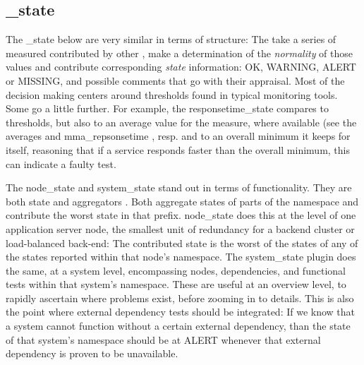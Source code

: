 \subsection{\_state \witches{}}

The \_state \witches{} below are very similar in terms of structure:
The take a series of measured contributed by other \witches{}, make a
determination of the \emph{normality} of those values and contribute
corresponding \emph{state} information: OK, WARNING, ALERT or MISSING,
and possible comments that go with their appraisal. Most of the decision
making centers around thresholds found in typical monitoring tools. Some
go a little further.  For example, the responsetime\_state compares to
thresholds, but also to an average value for the measure, where available
(see the averages and mma\_repsonsetime \witches{}, resp. and to an overall
minimum it keeps for itself, reasoning that if a service responds faster
than the overall minimum, this can indicate a faulty test.

The node\_state and system\_state \witches{} stand out in terms
of functionality. They are both state and aggregators \witches{}.
Both aggregate states of parts of the namespace and contribute the
worst state in that prefix. node\_state does this at the level of one
application server node, the smallest unit of redundancy for a backend
cluster or load-balanced back-end: The contributed state is the worst of
the states of any of the states reported within that node's namespace. The
system\_state plugin does the same, at a system level, encompassing nodes,
dependencies, and functional tests within that system's namespace.
These \witches{} are useful at an overview level, to rapidly ascertain
where problems exist, before zooming in to details.  This is also the
point where external dependency tests should be integrated: If we know
that a system cannot function without a certain external dependency,
than the state of that system's namespace should be at ALERT whenever
that external dependency is proven to be unavailable.
